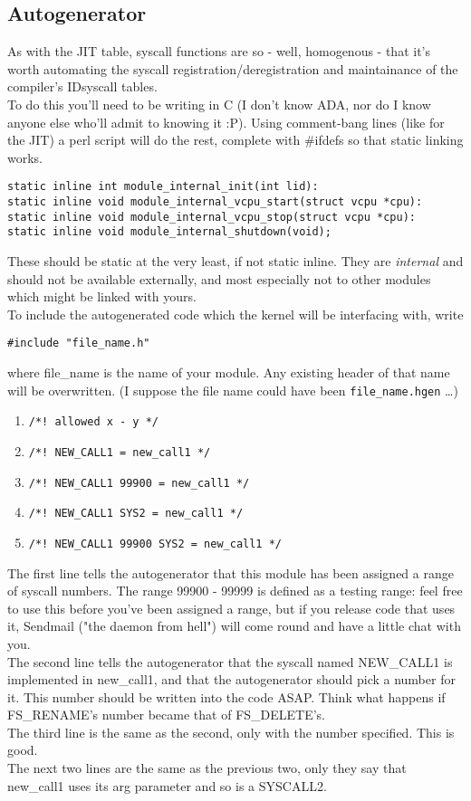 \documentclass[a4paper,oneside,openany]{book}
\begin{document}
\subsection{Autogenerator}
As with the JIT table, syscall functions are so - well, homogenous - that it's
worth automating the syscall registration/deregistration and maintainance of the
compiler's ID\rarrow{}syscall tables.\smallskip\\
To do this you'll need to be writing in C (I don't know ADA, nor do I know anyone
else who'll admit to knowing it :P). Using comment-bang lines (like for the JIT)
a perl script will do the rest, complete with \#ifdefs so that static linking works.
\begin{verbatim}
static inline int module_internal_init(int lid):
static inline void module_internal_vcpu_start(struct vcpu *cpu):
static inline void module_internal_vcpu_stop(struct vcpu *cpu):
static inline void module_internal_shutdown(void);
\end{verbatim}
These should be static at the very least, if not static inline.
They are \emph{internal} and should not be available externally, and most
especially not to other modules which might be linked with yours.\smallskip\\
To include the autogenerated code which the kernel will be interfacing
with, write
\begin{verbatim}
#include "file_name.h"
\end{verbatim}
where file\_name is the name of your module. Any existing header of that name
will be overwritten. (I suppose the file name could have been \texttt{file\_name.hgen}
\ldots)
\begin{enumerate}
\item\texttt{/*! allowed x - y */}
\item\texttt{/*! NEW\_CALL1 = new\_call1 */}
\item\texttt{/*! NEW\_CALL1 99900 = new\_call1 */}
\item\texttt{/*! NEW\_CALL1 SYS2 = new\_call1 */}
\item\texttt{/*! NEW\_CALL1 99900 SYS2 = new\_call1 */}
\end{enumerate}
The first line tells the autogenerator that this module has been assigned a
range of syscall numbers. The range 99900 - 99999 is defined as a testing range:
feel free to use this before you've been assigned a range, but if you release
code that uses it, Sendmail ("the daemon from hell") will come round and have a
little chat with you.\smallskip\\
The second line tells the autogenerator that the syscall named NEW\_CALL1 is
implemented in new\_call1, and that the autogenerator should pick a number for
it. This number should be written into the code ASAP. Think what happens if
FS\_RENAME's number became that of FS\_DELETE's.\smallskip\\
The third line is the same as the second, only with the number specified.
This is good.\smallskip\\
The next two lines are the same as the previous two, only they say that
new\_call1 uses its arg parameter and so is a SYSCALL2.
\end{document}
